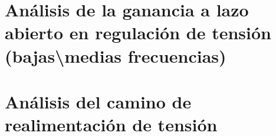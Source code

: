 \section{Análisis de la ganancia a lazo abierto en regulación de tensión (bajas\textbackslash medias frecuencias)}
\resetallcounters

\clearpage

\section{Análisis del camino de realimentación de tensión}
\resetallcounters

\clearpage

